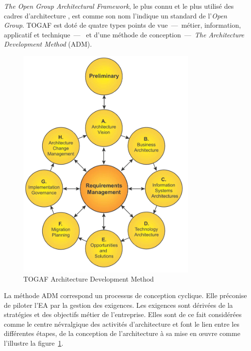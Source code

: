 \textit{The Open Group Architectural Framework}, le plus connu et le plus utilisé des cadres d'architecture \cite{winter2008enterprise}, est comme son nom l'indique un standard de l'\textit{Open Group}. TOGAF est doté de quatre types points de vue~—~métier, information, applicatif et technique~—~  et d'une méthode de conception~—~\textit{The Architecture Development Method} (ADM). 

\begin{figure}[!htbp]
 \begin{center}
  \includegraphics[width=0.8\textwidth]{images/Chapitre1/TOGAF9_Wheel.png}
 \end{center}
 \caption{TOGAF Architecture Development Method  \protect\cite{togaf2009}}
 \label{fig:TOGAF}
\end{figure}

La méthode ADM correspond un processus de conception cyclique. Elle préconise de piloter l'EA par la gestion des exigences. Les exigences sont dérivées de la stratégies et des objectifs métier de l'entreprise. Elles sont de ce fait considérées comme le centre névralgique des activités d'architecture et font le lien entre les différentes étapes, de la conception de l'architecture à sa mise en œuvre comme l'illustre la figure~\ref{fig:TOGAF}. 

